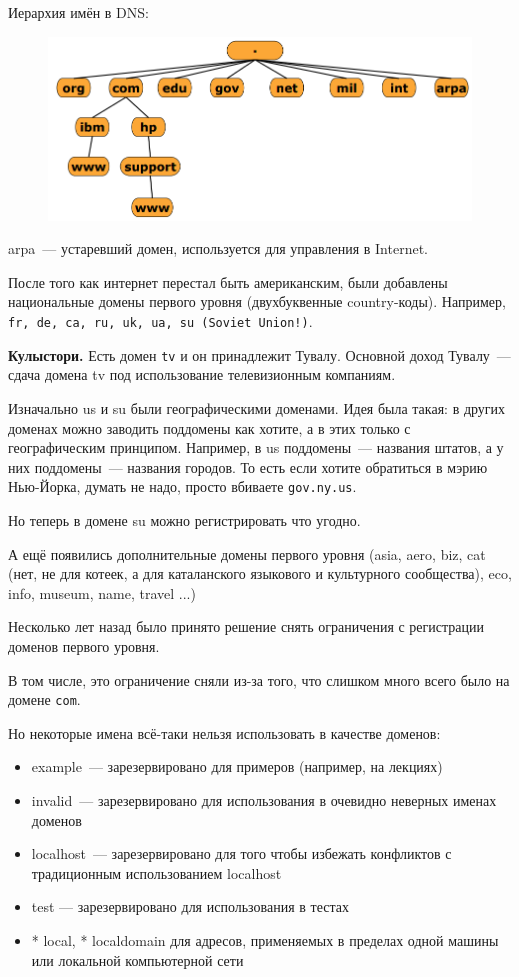 Иерархия имён в DNS:

\begin{figure}[H]
  \centering
  \includegraphics[width=15cm]{images/05/01}
\end{figure}

arpa~--- устаревший домен, используется для управления в Internet.

После того как интернет перестал быть американским, были добавлены национальные домены первого уровня (двухбуквенные country-коды). Например, {\tt fr, de, ca, ru, uk, ua, su (Soviet Union!)}.

{\bf Кулыстори.} Есть домен {\tt tv} и он принадлежит Тувалу. Основной доход Тувалу~--- сдача домена tv под использование телевизионным компаниям.

Изначально us и su были географическими доменами. Идея была такая: в других доменах можно заводить поддомены как хотите, а в этих только с географическим принципом. Например, в us поддомены~--- названия штатов, а у них поддомены~--- названия городов. То есть если хотите обратиться в мэрию Нью-Йорка, думать не надо, просто вбиваете {\tt gov.ny.us}.

Но теперь в домене su можно регистрировать что угодно.

А ещё появились дополнительные домены первого уровня (asia, aero, biz, cat (нет, не для котеек, а для каталанского языкового и культурного сообщества), eco, info, museum, name, travel ...)

Несколько лет назад было принято решение снять ограничения с регистрации доменов первого уровня.

В том числе, это ограничение сняли из-за того, что слишком много всего было на домене {\tt com}.

Но некоторые имена всё-таки нельзя использовать в качестве доменов:
\begin{itemize}
    \item example~--- зарезервировано для примеров (например, на лекциях) 
    \item invalid~--- зарезервировано для использования в очевидно неверных именах доменов 
    \item localhost~--- зарезервировано для того чтобы избежать конфликтов с традиционным использованием localhost
    \item test — зарезервировано для использования в тестах
    \item * local, * localdomain для адресов, применяемых в пределах одной машины или локальной компьютерной сети
\end{itemize}

